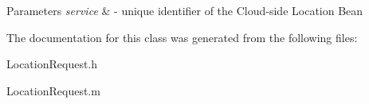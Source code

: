 \begin{DoxyParams}{\-Parameters}
{\em service} & -\/ unique identifier of the \-Cloud-\/side \-Location \-Bean \\
\hline
\end{DoxyParams}


\-The documentation for this class was generated from the following files\-:\begin{DoxyCompactItemize}
\item 
\-Location\-Request.\-h\item 
\-Location\-Request.\-m\end{DoxyCompactItemize}
